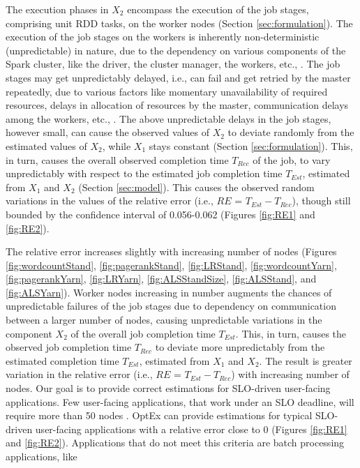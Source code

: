 \documentclass[conference]{IEEEtran}
\begin{document}
         \par The execution phases in $X_2$ encompass the execution of the job stages, comprising unit RDD tasks, on the worker nodes (Section \ref{sec:formulation}). The execution of the job stages on the workers is inherently non-deterministic (unpredictable) in nature, due to the dependency on various components of the Spark cluster, like the driver, the cluster manager, the workers, etc., \cite{Zaharia:2012:RDD:2228298.2228301}. The job stages may get unpredictably delayed, i.e., can fail and get retried by the master repeatedly, due to various factors like momentary unavailability of required resources, delays in allocation of resources by the master, communication delays among the workers, etc., \cite{Zaharia:2012:RDD:2228298.2228301}. The above unpredictable delays in the job stages, however small, can cause the observed values of $X_2$  to deviate randomly from the estimated values of $X_2$, while $X_1$  stays constant (Section \ref{sec:formulation}). This, in turn, causes the overall observed completion time $\mathit{T_{\mathit{Rec}}}$ of the job, to vary unpredictably with respect to the estimated job completion time $\mathit{T_{\mathit{Est}}}$, estimated from $X_1$  and $X_2$  (Section \ref{sec:model}). This causes the observed random variations in the values of the relative error (i.e., $RE$ = $T_{\mathit{Est}} - T_{\mathit{Rec}}$), though still bounded by the confidence interval of 0.056-0.062 (Figures \ref{fig:RE1} and \ref{fig:RE2}). \par The relative error increases slightly with increasing number of nodes (Figures \ref{fig:wordcountStand}, \ref{fig:pagerankStand}, \ref{fig:LRStand}, \ref{fig:wordcountYarn}, \ref{fig:pagerankYarn}, \ref{fig:LRYarn}, \ref{fig:ALSStandSize}, \ref{fig:ALSStand}, and \ref{fig:ALSYarn}). Worker nodes increasing in number augments the chances of unpredictable failures of the job stages due to dependency on communication between a larger number of nodes, causing unpredictable variations in the component $X_2$ of the overall job completion time $\mathit{T_{\mathit{Est}}}$. This, in turn, causes the observed job completion time $\mathit{T_{\mathit{Rec}}}$ to deviate more unpredictably from the estimated completion time  $\mathit{T_{\mathit{Est}}}$, estimated from $X_1$ and $X_2$. The result is greater variation in the relative error (i.e., $RE$ = $T_{\mathit{Est}} - T_{\mathit{Rec}}$) with increasing number of nodes.
       Our goal is to
  provide correct estimations for SLO-driven user-facing applications. Few user-facing applications, that work under an SLO deadline, will require more than 50 nodes \cite{spark:usecase1234, spark:usecase5678}. OptEx can provide estimations for typical SLO-driven user-facing applications with a relative error close to 0 (Figures \ref{fig:RE1} and \ref{fig:RE2}). Applications that do not meet this criteria are batch processing applications, like
\end{document}
